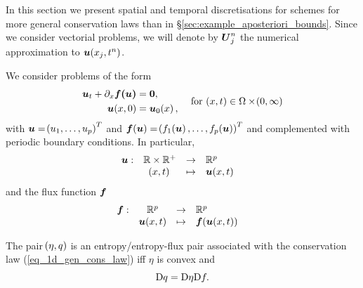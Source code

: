 \documentclass[final]{amsart}
\renewcommand{\dfunkmapsto}[5]{\ensuremath{
		\begin{array}{rccl}
			{#1}: & {#2} &\to&{#3}
			\\
			& {#4} &\mapsto&{#5}
		\end{array}\quad}}
\renewcommand{\vect}[1]{\geovec{#1}}
\renewcommand{\vec}[1]{\geovec{#1}}
\numberwithin{equation}{section}
\begin{document}
In this section we present spatial and temporal discretisations for schemes for more general conservation laws than in \S\ref{sec:example_aposteriori_bounds}.  Since we consider vectorial problems, we will denote by $\vec{U}^n_j$ the numerical approximation to $\vec u\qp{x_j, t^n}$.  
\begin{Rem} We consider problems of the form
	\begin{equation}\label{eq_1d_gen_cons_law}
	\begin{aligned}
	\vect{u}_t+\partial_x\vect{f\qp{\vect{u}}}&=\vect{0},\\
	\vect{u}\qp{x,0}&=\vect{u}_0\qp{x},
	\end{aligned}\quad \text{ for } \qp{x,t}\in \W\times\qp{0,\infty}
	\end{equation}
	with $\vect{u}=\qp{u_1,\dots,u_p}^T$ and $\vect{f}\qp{\vect{u}}=\qp{f_1\qp{\vect{u}},\dots,f_p\qp{\vect{u}}}^T$ and complemented with periodic boundary conditions.
	In particular,
	\begin{equation}
	\dfunkmapsto{\vec{u}}{\mathbb{R}\times\mathbb{R}^+}{\mathbb{R}^p}{\qp{x,t}}{\vect{u}\qp{x,t}}
	\end{equation}
	and the flux function $\vect{f}$
	\begin{equation}
	\dfunkmapsto{\vec{f}}{\mathbb{R}^p}{\mathbb{R}^p}{\vect{u}\qp{x,t}}{\vect{f}\qp{\vect{u}\qp{x,t}}}
	\end{equation}
\end{Rem}

\begin{Defn}
	The pair $\!\left({\eta, q}\right)$ is an entropy/entropy-flux pair associated with the conservation law (\ref{eq_1d_gen_cons_law}) iff $\eta$ is convex and
	\begin{equation}
	\mathrm{D} q= \mathrm{D}\eta \mathrm{D} f.
	\end{equation}  
\end{Defn}
\end{document}
